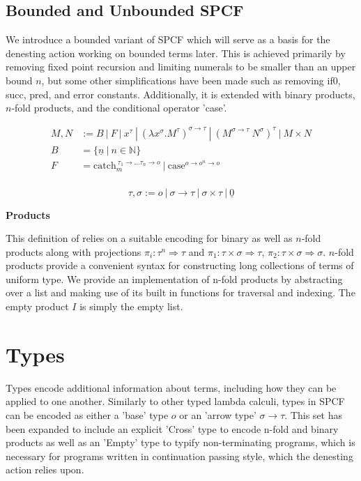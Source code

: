 \documentclass[12pt,a4paper]{report}
\theoremstyle{definition}
\theoremstyle{remark}
\begin{document}
\subsection{Bounded and Unbounded SPCF}
We introduce a bounded variant of SPCF which will serve as a basis for the denesting action working on bounded terms later. This is achieved primarily by removing fixed point recursion and limiting numerals to be smaller than an upper bound $n$, but some other simplifications have been made such as removing if0, succ, pred, and error constants. Additionally, it is extended with binary products, $n$-fold products, and the conditional operator 'case'.  

\begin{equation} \label{eq:bounded_spcf_grammar}
\begin{split}
    M,N &:= B\ |\ F\ |\ x^{\tau}\ |\ (\lambda x^{\sigma} .M^{\tau})^{\sigma \rightarrow \tau}\ |\ (M^{\sigma \rightarrow \tau} \ N^{\sigma})^{\tau}\ | \ M \times N\\
    B &= \{\underline{n}\ |\ n\in \mathbb{N}\}\\
    F &= \text{catch}_{m}^{\ \tau_1 \rightarrow \dots \tau_n \rightarrow o}\ |\ \text{case}^{o \rightarrow o^n \rightarrow o}\\
\end{split}
\end{equation}

\begin{equation}
    \tau , \sigma := o\ |\ \sigma \rightarrow \tau\ |\ \sigma \times \tau\ |\ \underline{0}
\end{equation}

\textbf{Products}

This definition of relies on a suitable encoding for binary as well as $n$-fold products along with projections $\pi_i : \tau^n \Rightarrow \tau$ and $\pi_1 : \tau \times \sigma \Rightarrow \tau$, $\pi_2 : \tau \times \sigma \Rightarrow \sigma$. $n$-fold products provide a convenient syntax for constructing long collections of terms of uniform type. We provide an implementation of n-fold products by abstracting over a list and making use of its built in functions for traversal and indexing. The empty product $I$ is simply the empty list.

\section{Types}\label{section: typing}
Types encode additional information about terms, including how they can be applied to one another. Similarly to other typed lambda calculi, types in SPCF can be encoded as either a 'base' type $o$ or an 'arrow type' $\sigma \rightarrow \tau$. This set has been expanded to include an explicit 'Cross' type to encode n-fold and binary products as well as an 'Empty' type to typify non-terminating programs, which is necessary for programs written in continuation passing style, which the denesting action relies upon.
\end{document}

